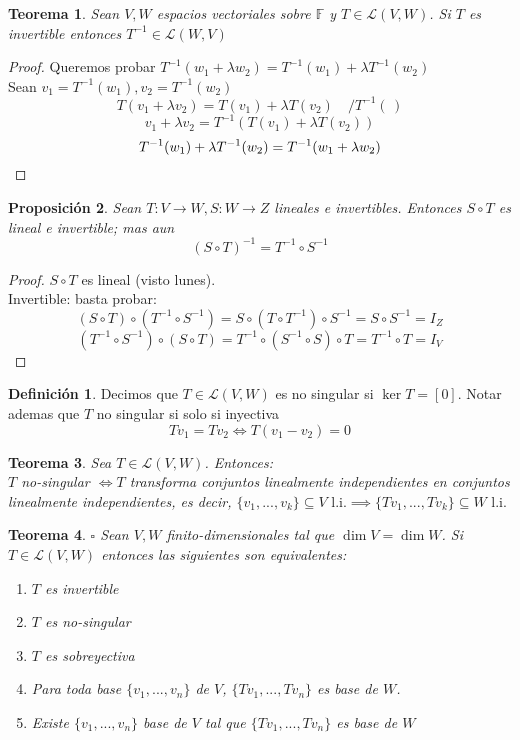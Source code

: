 \documentclass[11pt]{book}
\newtheorem{thm}{Teorema}[section]
\newtheorem{prop}[thm]{Proposición}
\theoremstyle{definition}
\newtheorem{defn}{Definición}[section]
\begin{document}
\begin{thm}
	Sean $V,W$ espacios vectoriales sobre $\mathbb{F}$ y $T\in\mathcal{L}(V,W)$. Si $T$ es invertible entonces $T^{-1}\in\mathcal{L}(W,V)$
\end{thm}
\begin{proof}
	Queremos probar $T^{-1}(w_1+\lambda w_2)=T^{-1}(w_1)+\lambda T^{-1}(w_2)$\\
	Sean $v_1=T^{-1}(w_1),v_2=T^{-1}(w_2)$
	\[
		T(v_1+\lambda v_2)=T(v_1)+\lambda T(v_2)\quad /T^{-1}(\,)
	\]
	\[
		v_1+\lambda v_2=T^{-1}(T(v_1)+\lambda T(v_2))
	\]
	\begin{equation}
		T^{-1}(w_1)+\lambda T^{-1}(w_2)=T^{-1}(w_1+\lambda w_2)\qedhere
	\end{equation}
\end{proof}
\begin{prop}
	Sean $T:V\rightarrow W,S:W\rightarrow Z$ lineales e invertibles. Entonces $S\circ T$ es lineal e invertible; mas aun
	\begin{equation}
		(S\circ T)^{-1}=T^{-1}\circ S^{-1}
	\end{equation}
\end{prop}
\begin{proof}
	$S\circ T$ es lineal (visto lunes).\\
	Invertible: basta probar:
	\[
		(S\circ T)\circ(T^{-1}\circ S^{-1})=S\circ (T\circ T^{-1})\circ S^{-1}=S\circ S^{-1}=I_Z
	\]
	\[
		(T^{-1}\circ S^{-1})\circ (S\circ T)=T^{-1}\circ (S^{-1}\circ S)\circ T=T^{-1}\circ T=I_V
	\]
\end{proof}
\begin{defn}
	Decimos que $T\in\mathcal{L}(V,W)$ es no singular si $\ker T=[0]$. Notar ademas que $T$ no singular si solo si inyectiva
	\begin{equation}
		Tv_1=Tv_2\iff T(v_1-v_2)=0
	\end{equation}
\end{defn}
\begin{thm}
	Sea $T\in\mathcal{L}(V,W)$. Entonces:\\
	$T$ no-singular $\iff T$ transforma conjuntos linealmente independientes en conjuntos linealmente independientes, es decir, $\{v_1,...,v_k\}\subseteq V\textrm{ l.i.}\implies\{Tv_1,...,Tv_k\}\subseteq W\textrm{ l.i.}$
\end{thm}
\begin{thm}{$\square$ }
	Sean $V,W$ finito-dimensionales tal que $\dim V=\dim W$. Si $T\in\mathcal{L}(V,W)$ entonces las siguientes son equivalentes:
	\begin{enumerate}[label=\roman*)]
		\item $T$ es invertible

		\item $T$ es no-singular

		\item $T$ es sobreyectiva

		\item Para toda base $\{v_1,...,v_n\}$ de $V$, $\{Tv_1,...,Tv_n\}$ es base de $W$.

		\item Existe $\{v_1,...,v_n\}$ base de $V$ tal que $\{Tv_1,...,Tv_n\}$ es base de $W$
	\end{enumerate}
\end{thm}
\end{document}
